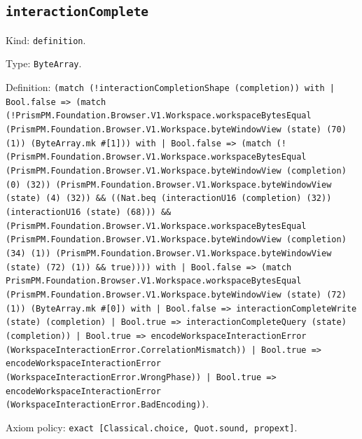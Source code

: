\documentclass[11pt]{article}
\begin{document}
\subsection*{\texttt{interactionComplete}}
\noindent Kind: \texttt{definition}.\par
\noindent Type: \texttt{ByteArray}.\par
\noindent Definition: \texttt{(match (!interactionCompletionShape (completion)) with | Bool.false => (match (!PrismPM.Foundation.Browser.V1.Workspace.workspaceBytesEqual (PrismPM.Foundation.Browser.V1.Workspace.byteWindowView (state) (70) (1)) (ByteArray.mk \#[1])) with | Bool.false => (match (!(PrismPM.Foundation.Browser.V1.Workspace.workspaceBytesEqual (PrismPM.Foundation.Browser.V1.Workspace.byteWindowView (completion) (0) (32)) (PrismPM.Foundation.Browser.V1.Workspace.byteWindowView (state) (4) (32)) \&\& ((Nat.beq (interactionU16 (completion) (32)) (interactionU16 (state) (68))) \&\& (PrismPM.Foundation.Browser.V1.Workspace.workspaceBytesEqual (PrismPM.Foundation.Browser.V1.Workspace.byteWindowView (completion) (34) (1)) (PrismPM.Foundation.Browser.V1.Workspace.byteWindowView (state) (72) (1)) \&\& true)))) with | Bool.false => (match PrismPM.Foundation.Browser.V1.Workspace.workspaceBytesEqual (PrismPM.Foundation.Browser.V1.Workspace.byteWindowView (state) (72) (1)) (ByteArray.mk \#[0]) with | Bool.false => interactionCompleteWrite (state) (completion) | Bool.true => interactionCompleteQuery (state) (completion)) | Bool.true => encodeWorkspaceInteractionError (WorkspaceInteractionError.CorrelationMismatch)) | Bool.true => encodeWorkspaceInteractionError (WorkspaceInteractionError.WrongPhase)) | Bool.true => encodeWorkspaceInteractionError (WorkspaceInteractionError.BadEncoding))}.\par
\noindent Axiom policy: \texttt{exact [Classical.choice, Quot.sound, propext]}.\par
\end{document}
